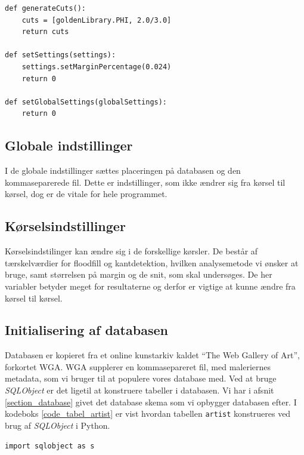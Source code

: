 {\begin{lstlisting}[caption={Pseudokode for et experiment, som checker på
    $\varPhi$ og $\frac{2}{3}$}, frame=tb, label={pseudo_experiment},
    captionpos=b, float=h]
def generateCuts():
	cuts = [goldenLibrary.PHI, 2.0/3.0]
	return cuts

def setSettings(settings):
	settings.setMarginPercentage(0.024)
	return 0

def setGlobalSettings(globalSettings):
	return 0
\end{lstlisting}

\subsection{Globale indstillinger}
I de globale indstillinger sættes placeringen på databasen og den
kommaseparerede fil. Dette er indstillinger, som ikke ændrer sig fra
kørsel til kørsel, dog er de vitale for hele programmet.

\subsection{Kørselsindstillinger}
Kørselsindstilinger kan ændre sig i de forskellige kørsler. De består af
tærskelværdier for floodfill og kantdetektion, hvilken analysemetode vi
ønsker at bruge, samt størrelsen på margin og de snit, som skal
undersøges. De her variabler betyder meget for resultaterne og derfor er
vigtige at kunne ændre fra kørsel til kørsel.

\subsection{Initialisering af databasen}
Databasen er kopieret fra et online kunstarkiv kaldet ``The Web Gallery
of Art''\cite{wgahu}, forkortet WGA. WGA supplerer en kommasepareret fil, med
maleriernes metadata, som vi bruger til at populere vores database med.
Ved at bruge \emph{SQLObject} er det ligetil at konstruere tabeller i
databasen. Vi har i afsnit \ref{section_database} givet det database
skema som vi opbygger databasen efter. I kodeboks
\ref{code_tabel_artist} er vist hvordan tabellen \texttt{artist}
konstrueres ved brug af \emph{SQLObject} i Python.

\begin{lstlisting}[caption={Pythonkode for oprettelse af tabeller i
    databasen.}, captionpos=b, label={code_tabel_artist}, frame=tb,
    breaklines=false, float=hb]
import sqlobject as s


\end{lstlisting}}
